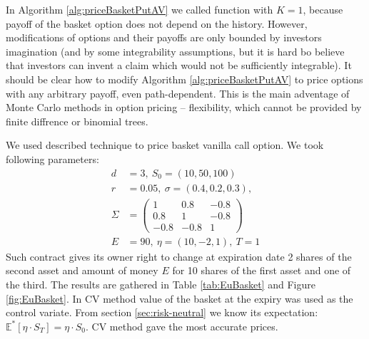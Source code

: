 \documentclass[a4paper,11pt, twoside]{book}
\theoremstyle{definition}
\theoremstyle{remark}
\def\Em{{\mathbb{E}^*}}
\begin{document}
In Algorithm \ref{alg:priceBasketPutAV} we called function  with $K=1$, because payoff of the basket option does not depend on the history. However, modifications of options and their payoffs are only bounded by investors imagination (and by some integrability assumptions, but it is hard bo believe that investors can invent a claim which would not be sufficiently integrable).
It should be clear how to modify Algorithm \ref{alg:priceBasketPutAV} to price options with any arbitrary payoff, even path-dependent. This is the main adventage of Monte Carlo methods in option pricing -- flexibility, which cannot be provided by finite diffrence or binomial trees.

We used described technique to price basket vanilla call option. We took following parameters:
\begin{equation}
\label{eq:EuBasketParams}
 \begin{split}
  d &= 3,\ S_0 = (10, 50, 100)\\
  r &= 0.05,\ \sigma = (0.4, 0.2, 0.3),\\ 
  \Sigma &= \left( \begin{array}{rrr}
            1 & 0.8 & -0.8\\
            0.8 & 1 & -0.8\\
            -0.8 & -0.8 & 1
           \end{array} \right)\\
  E &= 90,\ \eta = (10, -2, 1),\ T=1
 \end{split}
\end{equation}
Such contract gives its owner right to change at expiration date 2 shares of the second asset and amount of money $E$ for 10 shares of the first asset and one of the third. The results are gathered in Table \ref{tab:EuBasket} and Figure \ref{fig:EuBasket}. In CV method value of the basket at the expiry was used as the control variate. From section \ref{sec:risk-neutral} we know its expectation: $\Em[\eta \cdot S_T] = \eta \cdot S_0$. 
CV method gave the most accurate prices.
\end{document}
